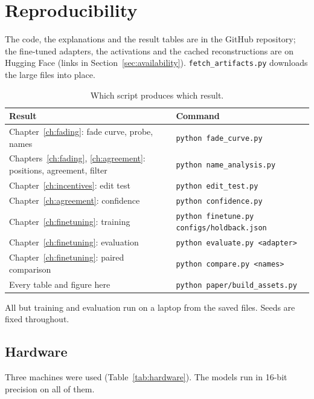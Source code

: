 \chapter{Reproducibility}
\label{app:repro}

The code, the explanations and the result tables are in the GitHub repository; the fine-tuned adapters, the
activations and the cached reconstructions are on Hugging Face (links in Section~\ref{sec:availability}).
\texttt{fetch\_artifacts.py} downloads the large files into place.

\begin{table}[h]
\centering
\small
\setlength{\tabcolsep}{4pt}
\begin{tabular}{@{}ll@{}}
\toprule
Result & Command \\
\midrule
Chapter~\ref{ch:fading}: fade curve, probe, names & \texttt{python fade\_curve.py} \\
Chapters~\ref{ch:fading}, \ref{ch:agreement}: positions, agreement, filter & \texttt{python name\_analysis.py} \\
Chapter~\ref{ch:incentives}: edit test & \texttt{python edit\_test.py} \\
Chapter~\ref{ch:agreement}: confidence & \texttt{python confidence.py} \\
Chapter~\ref{ch:finetuning}: training & \texttt{python finetune.py configs/holdback.json} \\
Chapter~\ref{ch:finetuning}: evaluation & \texttt{python evaluate.py <adapter>} \\
Chapter~\ref{ch:finetuning}: paired comparison & \texttt{python compare.py <names>} \\
Every table and figure here & \texttt{python paper/build\_assets.py} \\
\bottomrule
\end{tabular}
\caption{Which script produces which result.}
\end{table}

All but training and evaluation run on a laptop from the saved files. Seeds are fixed throughout.

\section{Hardware}

Three machines were used (Table~\ref{tab:hardware}). The models run in 16-bit precision on all of them.


